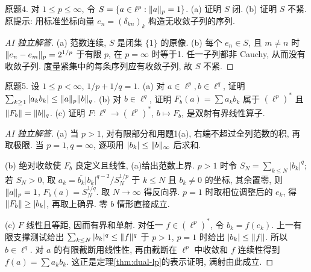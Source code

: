 \begin{exercise}\label{ps01:4}
原题4. 对 $1\le p\le\infty$, 令 $S=\{a\in\ell^p:\lVert a\rVert_p=1\}$. (a) 证明 $S$ 闭. (b) 证明 $S$ 不紧. 原提示: 用标准坐标向量 $e_n=(\delta_{kn})_k$ 构造无收敛子列的序列.
\end{exercise}
\begin{proof}[AI 独立解答]
(a) 范数连续, $S$ 是闭集 $\{1\}$ 的原像. (b) 每个 $e_n\in S$, 且 $m\ne n$ 时 $\lVert e_n-e_m\rVert_p=2^{1/p}$ 于有限 $p$, 在 $p=\infty$ 时等于1. 任一子列都非 Cauchy, 从而没有收敛子列. 度量紧集中的每条序列应有收敛子列, 故 $S$ 不紧.
\end{proof}
\begin{exercise}\label{ps01:5}
原题5. 设 $1\le p<\infty$, $1/p+1/q=1$. (a) 对 $a\in\ell^p,b\in\ell^q$, 证明 $\sum_{k\ge1}|a_kb_k|\le\lVert a\rVert_p\lVert b\rVert_q$. (b) 对 $b\in\ell^q$, 证明 $F_b(a)=\sum a_kb_k$ 属于 $(\ell^p)^*$ 且 $\lVert F_b\rVert=\lVert b\rVert_q$. (c) 证明 $F:\ell^q\to(\ell^p)^*$, $b\mapsto F_b$, 是双射有界线性算子.
\end{exercise}
\begin{proof}[AI 独立解答]
(a) 当 $p>1$, 对有限部分和用题1(a), 右端不超过全列范数的积, 再取极限. 当 $p=1,q=\infty$, 逐项用 $|b_k|\le\lVert b\rVert_\infty$ 后求和.

(b) 绝对收敛使 $F_b$ 良定义且线性, (a)给出范数上界. $p>1$ 时令 $S_N=\sum_{k\le N}|b_k|^q$; 若 $S_N>0$, 取 $a_k=\overline{b_k}|b_k|^{q-2}/S_N^{1/p}$ 于 $k\le N$ 且 $b_k\ne0$ 的坐标, 其余置零, 则 $\lVert a\rVert_p=1$, $F_b(a)=S_N^{1/q}$. 取 $N\to\infty$ 得反向界. $p=1$ 时取相位调整后的 $e_k$, 得 $\lVert F_b\rVert\ge|b_k|$, 再取上确界. 零 $b$ 情形直接成立.

(c) $F$ 线性且等距, 因而有界和单射. 对任一 $f\in(\ell^p)^*$, 令 $b_k=f(e_k)$. 上一有限支撑测试给出 $\sum_{k\le N}|b_k|^q\le\lVert f\rVert^q$ 于 $p>1$, $p=1$ 时给出 $|b_k|\le\lVert f\rVert$. 所以 $b\in\ell^q$. 对 $a$ 的有限截断用线性性, 再由截断在 $\ell^p$ 中收敛和 $f$ 连续性得到 $f(a)=\sum a_kb_k$. 这正是定理\ref{thm:dual-lp}的表示证明, 满射由此成立.
\end{proof}
